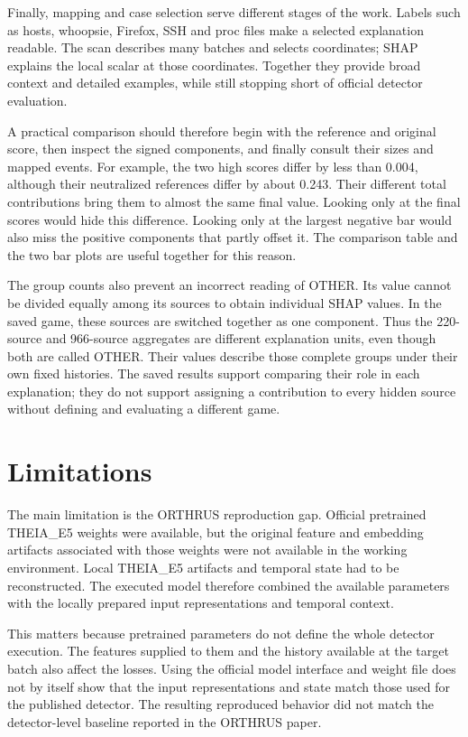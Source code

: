 \documentclass[11pt,a4paper]{article}
\begin{document}
Finally, mapping and case selection serve different stages of the work. Labels
such as hosts, whoopsie, Firefox, SSH and proc files make a selected explanation
readable. The scan describes many batches and selects coordinates; SHAP explains
the local scalar at those coordinates. Together they provide broad context and
detailed examples, while still stopping short of official detector evaluation.

A practical comparison should therefore begin with the reference and original
score, then inspect the signed components, and finally consult their sizes and
mapped events. For example, the two high scores differ by less than 0.004,
although their neutralized references differ by about 0.243. Their different
total contributions bring them to almost the same final value. Looking only
at the final scores would hide this difference. Looking only at the largest
negative bar would also miss the positive components that partly offset it.
The comparison table and the two bar plots are useful together for this reason.

The group counts also prevent an incorrect reading of OTHER. Its value cannot
be divided equally among its sources to obtain individual SHAP values. In the
saved game, these sources are switched together as one component. Thus the
220-source and 966-source aggregates are different explanation units, even
though both are called OTHER. Their values describe those complete groups
under their own fixed histories. The saved results support comparing their
role in each explanation; they do not support assigning a contribution to
every hidden source without defining and evaluating a different game.

\section{Limitations}
The main limitation is the ORTHRUS reproduction gap. Official pretrained
THEIA\_E5 weights were available, but the original feature and embedding
artifacts associated with those weights were not available in the working
environment. Local THEIA\_E5 artifacts and temporal state had to be reconstructed.
The executed model therefore combined the available parameters with the
locally prepared input representations and temporal context.

This matters because pretrained parameters do not define the whole detector
execution. The features supplied to them and the history available at the
target batch also affect the losses. Using the official model interface and
weight file does not by itself show that the input representations and state
match those used for the published detector. The resulting reproduced behavior
did not match the detector-level baseline reported in the ORTHRUS paper.
\end{document}
